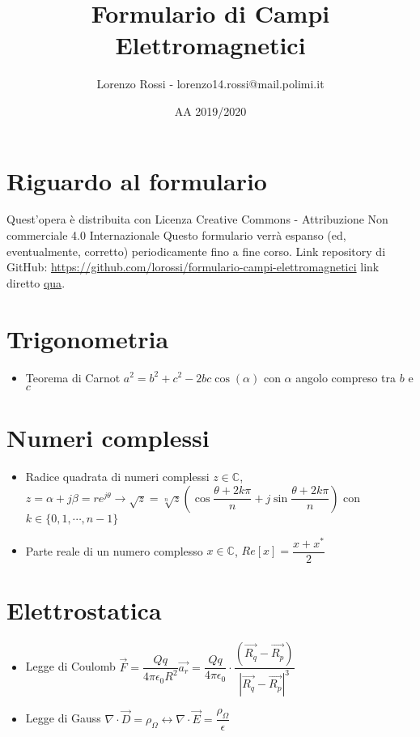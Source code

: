 \documentclass{article}
\title{Formulario di Campi Elettromagnetici}
\author{Lorenzo Rossi - lorenzo14.rossi@mail.polimi.it}
\date{AA 2019/2020}
\begin{document}
\maketitle

\section{Riguardo al formulario}
Quest'opera è distribuita con Licenza Creative Commons - Attribuzione Non commerciale 4.0 Internazionale \ccbynceu  \newline
Questo formulario verrà espanso (ed, eventualmente, corretto) periodicamente fino a fine corso.
Link repository di GitHub: \url{https://github.com/lorossi/formulario-campi-elettromagnetici} link diretto \href{https://github.com/lorossi/formulario-campi-elettromagnetici/blob/master/formule_campi.pdf}{qua}. \newline 

\section{Trigonometria}
\begin{itemize}
	\item Teorema di Carnot \( a^2 = b^2 + c^2 - 2bc\cos(\alpha)\) con \(\alpha\) angolo compreso tra \(b\) e \(c\) 
\end{itemize}

\section{Numeri complessi}
\begin{itemize}
	\item Radice quadrata di numeri complessi \(z \in \mathbb{C}\), \( z = \alpha + j \beta = r e^{j \theta} \rightarrow \sqrt{z} = \sqrt[n]{z} ( \cos{\dfrac{\theta + 2k\pi}{n}} + j \sin{\dfrac{\theta + 2 k \pi}{n}} ) \) \newline con \(k \in \{0, 1, \cdots, n-1 \} \)
	\item Parte reale di un numero complesso \(x \in \mathbb{C}\), \(Re[x] = \dfrac{x + x^{*}}{2} \)
\end{itemize}

\section{Elettrostatica}
\begin{itemize}
	\item Legge di Coulomb \( \vec{F} = \dfrac{Qq}{4 \pi \epsilon_0 R^2} \vec{a_r} = \dfrac{Qq}{4 \pi \epsilon_0} \cdot \dfrac{(\vec{R_q} - \vec{R_p})}{| \vec{R_q} - \vec{R_p} | ^3 } \)
	\item Legge di Gauss \( \nabla \cdot \vec{D} = \rho_\Omega \leftrightarrow \nabla \cdot \vec{E} = \dfrac{\rho_\Omega}{\epsilon} \)
\end{itemize}
\end{document}
